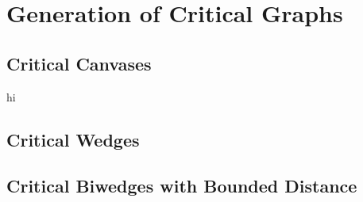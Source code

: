 \section{Generation of Critical Graphs}

\subsection{Critical Canvases}

\begin{theorem}
hi
\end{theorem}

\subsection{Critical Wedges}

\subsection{Critical Biwedges with Bounded Distance}